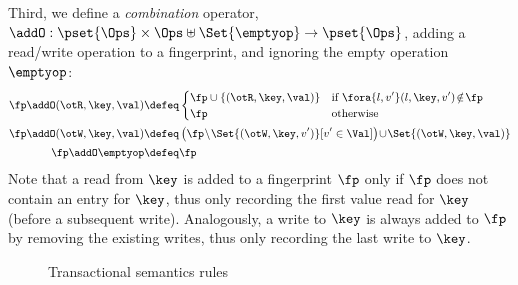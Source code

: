 Third, we define a \emph{combination} operator,
$\addO  : \pset{\Ops} \times \Ops \uplus \Set{\emptyop} \to \pset{\Ops}$, 
adding a read/write operation to a fingerprint, and ignoring the empty operation $\emptyop$:%
\[
\small
\begin{aligned}
    \fp \addO (\otR, \key, \val)  
    & \defeq
    \begin{cases}
        \fp \cup \{(\otR, \key, \val)\} & \text{if } \fora{l, v'} (l, \key, v') \! \notin \! \fp \\
        \fp &  \text{otherwise} \\
    \end{cases}  \\
    \fp \addO (\otW, \key, \val) 
    & \defeq 
    \left( \fp \! \setminus \! \Set{(\otW, \key, v')}[v' \in \Val] \right)  \!
    \cup \! \Set{(\otW, \key, \val)} \\
    \fp \addO \emptyop  & \defeq \fp 
\end{aligned}
\]
Note that a read from $\key$ is added to a fingerprint $\fp$ only if $\fp$ does not contain an entry for $\key$, thus only recording the first value read for $\key$ (before a subsequent write). 
Analogously, a write to $\key$ is always added to $\fp$ by removing the existing writes, thus only recording the last write to $\key$. 

%
\begin{figure*}[!t]
\small
{}
\hrulefill

\captionsetup{belowskip=-5pt}
\caption{Transactional semantics rules}
\label{fig:semantics-trans}
\end{figure*}

